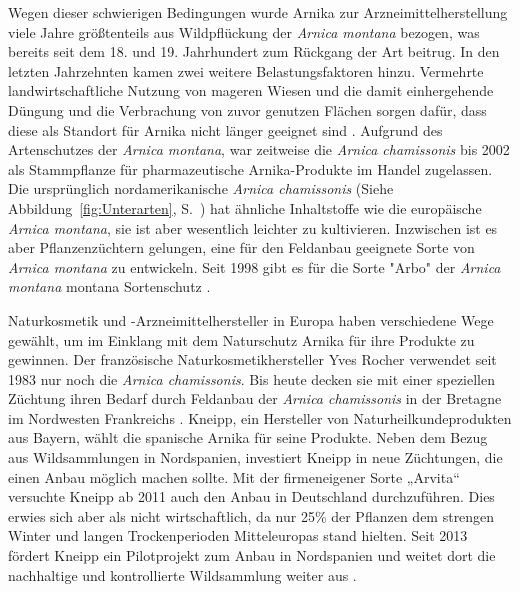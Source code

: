 Wegen dieser schwierigen Bedingungen wurde Arnika zur Arzneimittelherstellung viele Jahre größtenteils aus Wildpflückung der \textit{Arnica montana} bezogen, was bereits seit dem 18. und 19. Jahrhundert zum Rückgang der Art beitrug. In den letzten Jahrzehnten kamen zwei weitere Belastungsfaktoren hinzu. Vermehrte landwirtschaftliche Nutzung von mageren Wiesen und die damit einhergehende Düngung und die Verbrachung von zuvor genutzen Flächen sorgen dafür, dass diese als Standort für Arnika nicht länger geeignet sind \citep[vgl.][]{Franke2012}.
Aufgrund des Artenschutzes der \textit{Arnica montana}, war zeitweise die \textit{Arnica chamissonis} bis 2002 als Stammpflanze für pharmazeutische Arnika-Produkte im Handel zugelassen. Die ursprünglich nordamerikanische \textit{Arnica chamissonis} (Siehe Abbildung~\ref{fig:Unterarten}, S.~\pageref{fig:Unterarten}) hat ähnliche Inhaltstoffe wie die europäische \textit{Arnica montana}, sie ist aber wesentlich leichter zu kultivieren. Inzwischen ist es aber Pflanzenzüchtern gelungen, eine für den Feldanbau geeignete Sorte von \textit{Arnica montana} zu entwickeln. Seit 1998 gibt es für die Sorte "Arbo" der \textit{Arnica montana} montana Sortenschutz \citep[vgl.][S. 178]{Schoenfelder2015}.


Naturkosmetik und -Arzneimittelhersteller in Europa haben verschiedene Wege gewählt, um im Einklang mit dem Naturschutz Arnika für ihre Produkte zu gewinnen. Der französische Naturkosmetikhersteller Yves Rocher verwendet seit 1983 nur noch die \textit{Arnica chamissonis}. Bis heute decken sie mit einer speziellen Züchtung ihren Bedarf durch Feldanbau der \textit{Arnica chamissonis} in der Bretagne im Nordwesten Frankreichs \citep[vgl.][]{Rocher2019}. Kneipp, ein Hersteller von Naturheilkundeprodukten aus Bayern, wählt die spanische Arnika für seine Produkte. Neben dem Bezug aus Wildsammlungen in Nordspanien, investiert Kneipp in neue Züchtungen, die einen Anbau möglich machen sollte. Mit der firmeneigener Sorte „Arvita“ versuchte Kneipp ab 2011 auch den Anbau in Deutschland durchzuführen. Dies erwies sich aber als nicht wirtschaftlich, da nur 25\% der Pflanzen dem strengen Winter und langen Trockenperioden Mitteleuropas stand hielten. Seit 2013 fördert Kneipp ein Pilotprojekt zum Anbau in Nordspanien und weitet dort die nachhaltige und kontrollierte Wildsammlung weiter aus \citep[vgl.][]{Kneipp2019, Markenverband2019}.

